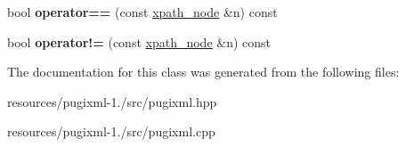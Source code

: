 \begin{DoxyCompactItemize}
\item 
\hypertarget{classpugi_1_1xpath__node_ac41341c30e66880aad2a731203d9cf4b}{bool {\bfseries operator==} (const \hyperlink{classpugi_1_1xpath__node}{xpath\+\_\+node} \&n) const }\label{classpugi_1_1xpath__node_ac41341c30e66880aad2a731203d9cf4b}

\item 
\hypertarget{classpugi_1_1xpath__node_a785725ca60a15a9d2df83b91725105bd}{bool {\bfseries operator!=} (const \hyperlink{classpugi_1_1xpath__node}{xpath\+\_\+node} \&n) const }\label{classpugi_1_1xpath__node_a785725ca60a15a9d2df83b91725105bd}

\end{DoxyCompactItemize}


The documentation for this class was generated from the following files\+:\begin{DoxyCompactItemize}
\item 
resources/pugixml-\/1./src/pugixml.\+hpp\item 
resources/pugixml-\/1./src/pugixml.\+cpp\end{DoxyCompactItemize}
